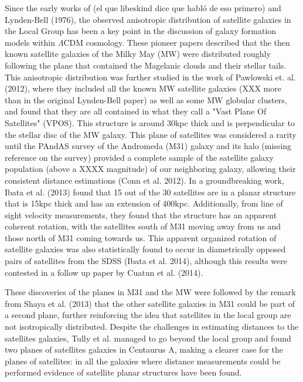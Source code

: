 \documentclass{emulateapj}
\begin{document}
\noindent Since the early works of (el que libeskind dice que habló de
eso primero) and Lynden-Bell (1976), the observed anisotropic
distribution of satellite galaxies in the Local Group has been a key
point in the discussion of galaxy formation models within $\Lambda$CDM
cosmology. These pioneer papers described that the then known satellite
galaxies of the Milky May (MW) were distributed roughly following the plane
that contained the Magelanic clouds and their stellar tails. This
anisotropic distribution was further studied in the work of Pawlowski
et. al. (2012), where they included all the known MW satellite galaxies (XXX
more than in the original Lynden-Bell paper) as well as some MW globular
clusters, and found that they are all contained in what they call a
"Vast Plane Of Satellites" (VPOS). This structure is around 30kpc thick and
is perpendicular to the stellar disc of the MW galaxy. This plane of
satellites was considered a rarity until the PAndAS survey of the
Andromeda (M31) galaxy and its halo (missing reference on the survey)
provided a complete sample of the satellite galaxy population (above a
XXXX magnitude) of our neighboring galaxy, allowing their consistent distance
estimations (Conn et al. 2012). In a groundbreaking work, Ibata et
al. (2013) found that 15 out of the 30 satellites are in a planar
structure that is 15kpc thick and has an extension of 400kpc.
Additionally, from line of sight velocity measurements, they
found that the structure has an apparent coherent rotation, with the
satellites south of M31 moving away from us and those north of M31
coming towards us. This apparent organized rotation of satellite galaxies was also
statistically found to occur in diametrically opposed 
pairs of satellites from the SDSS (Ibata et al. 2014), although this
results were contested in a follow up paper by Cuatun et al. (2014).  

These discoveries of the planes in M31 and the MW were followed by the
remark from Shaya et al. (2013) that the other satellite galaxies in
M31 could be part of a second plane, further reinforcing the idea that
satellites in the local group are not isotropically distributed.
Despite the challenges in estimating distances to the satellites
galaxies, Tully et al. managed to go beyond the local group and found
two planes of satellites galaxies in Centaurus A, making a clearer
case for the planes of satellites: in all the galaxies where distance
measurements could be performed evidence of satellite planar
structures have been found.\\
\end{document}
